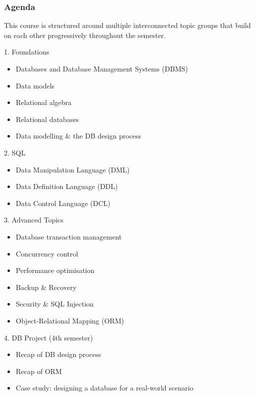 \begin{frame}
  \frametitle{Agenda}

  This course is structured around multiple interconnected topic groups that build on each other progressively throughout the semester.

  \begin{block}{1. Foundations}
    \begin{itemize}
      \item Databases and Database Management Systems (DBMS)
      \item Data models
      \item Relational algebra
      \item Relational databases
      \item Data modelling \& the DB design process
    \end{itemize}
  \end{block}

  \begin{block}{2. SQL}
    \begin{itemize}
      \item Data Manipulation Language (DML)
      \item Data Definition Language (DDL)
      \item Data Control Language (DCL)
    \end{itemize}
  \end{block}
\end{frame}

\begin{frame}
  \begin{block}{3. Advanced Topics}
    \begin{itemize}
      \item Database transaction management
      \item Concurrency control
      \item Performance optimisation
      \item Backup \& Recovery
      \item Security \& SQL Injection
      \item Object-Relational Mapping (ORM)
    \end{itemize}
  \end{block}

  \begin{block}{4. DB Project (4th semester)}
    \begin{itemize}
      \item Recap of DB design process
      \item Recap of ORM
      \item Case study: designing a database for a real-world scenario
    \end{itemize}
  \end{block}
\end{frame}

